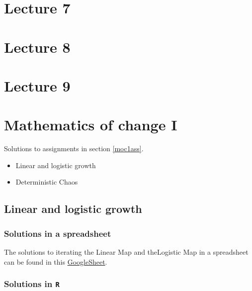 \documentclass[]{book}
\providecommand{\tightlist}{%
  \setlength{\itemsep}{0pt}\setlength{\parskip}{0pt}}
\let\stdsection\section
\renewcommand\section{\newpage\stdsection}
\begin{document}
\chapter*{Lecture 7}\label{lecture-7}

\chapter*{Lecture 8}\label{lecture-8}

\chapter*{Lecture 9}\label{lecture-9}

\appendix


\chapter{\texorpdfstring{\textbf{Mathematics of change
I}}{Mathematics of change I}}\label{mathematics-of-change-i}

Solutions to assignments in section \ref{moc1ass}.

\begin{itemize}
\tightlist
\item
  Linear and logistic growth
\item
  Deterministic Chaos
\end{itemize}

\hypertarget{linear-and-logistic-growth}{\section{Linear and logistic
growth}\label{linear-and-logistic-growth}}

\subsection*{Solutions in a
spreadsheet}\label{solutions-in-a-spreadsheet}

The solutions to iterating the Linear Map and theLogistic Map in a
spreadsheet can be found in this
\href{https://docs.google.com/spreadsheets/d/1BL_oKoCFH3NQ3qKLBQ-WbkPg_ppSZsyDNl2nS9oPGcM/edit?usp=sharing}{GoogleSheet}.

\subsection*{\texorpdfstring{Solutions in
\texttt{R}}{Solutions in R}}\label{solutions-in-r}
\end{document}

